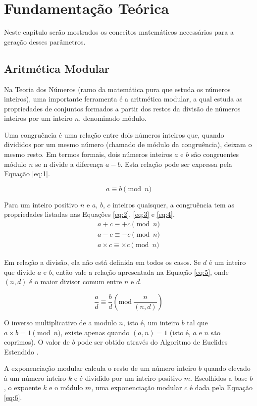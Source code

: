 \chapter{Fundamentação Teórica}\label{cap:fundamentacao}
Neste capítulo serão mostrados os conceitos matemáticos necessários para a geração desses parâmetros. 

%
%
\section{Aritmética Modular} \label{sec:aritmeticamodular} %
Na Teoria dos Números \cite{Niven:2014} (ramo da matemática pura que estuda os números inteiros), uma importante ferramenta é a aritmética modular,  a qual estuda as propriedades de conjuntos formados a partir dos restos da divisão de números inteiros por um inteiro $n$, denominado módulo.
\par Uma congruência é  uma relação entre dois números inteiros que, quando divididos por um mesmo número (chamado de módulo da congruência), deixam o mesmo resto.  Em termos formais, dois números inteiros \(a\) e \(b\) são congruentes módulo \(n\) se n divide a diferença \(a - b\).  Esta relação pode ser expressa pela Equação \ref{eq:1}.

\begin{equation}
  a \equiv b \pmod n \label{eq:1}
\end{equation}

Para um inteiro positivo \(n\) e \(a\), \(b\), \(c\) inteiros quaisquer, a congruência tem as propriedades listadas nas Equações \ref{eq:2}, \ref{eq:3} e \ref{eq:4}.
\begin{eqnarray}
  a + c \equiv + c \pmod n \label{eq:2} \\
  a - c \equiv - c \pmod n \label{eq:3} \\
  a \times c \equiv \times c \pmod n \label{eq:4}
\end{eqnarray}

Em relação a divisão, ela não está definida em todos os casos. Se \(d\) é um inteiro que divide \(a\) e \(b\), então vale a relação apresentada na Equação \ref{eq:5}, onde \((n, d)\) é o maior divisor comum entre \(n\) e \(d\).

\begin{equation}
  \frac{a}{d} \equiv \frac{b}{d}\left(\mbox{mod}\ \frac{n}{(n,d)}\right) \label{eq:5}%
\end{equation}

O inverso multiplicativo de a modulo \(n\), isto é, um inteiro \(b\) tal que \(a \times b = 1 \pmod  n\), existe apenas quando \((a, n) = 1\) (isto é, $a$ e $n$ são coprimos). O valor de \(b\) pode ser obtido através do Algoritmo de Euclides Estendido \cite{Halim:2013}.
\par A exponenciação modular calcula o resto de um número inteiro \(b\) quando elevado à um número inteiro \(k\) e é dividido por um inteiro positivo \(m\). Escolhidos a base \(b\), o expoente \(k\) e o módulo \(m\), uma exponenciação modular \(c\) é dada pela Equação \ref{eq:6}.

